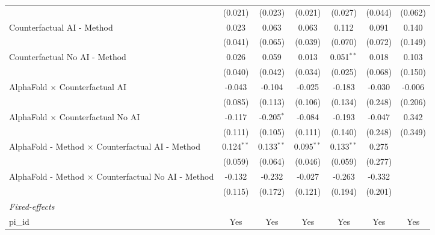 \begin{tabular}{lcccccc}
                                                              & (0.021)       & (0.023)       & (0.021)       & (0.027)       & (0.044)      & (0.062)\\   
   Counterfactual AI - Method                                 & 0.023         & 0.063         & 0.063         & 0.112         & 0.091        & 0.140\\   
                                                              & (0.041)       & (0.065)       & (0.039)       & (0.070)       & (0.072)      & (0.149)\\   
   Counterfactual No AI - Method                              & 0.026         & 0.059         & 0.013         & 0.051$^{**}$  & 0.018        & 0.103\\   
                                                              & (0.040)       & (0.042)       & (0.034)       & (0.025)       & (0.068)      & (0.150)\\   
   AlphaFold $\times$ Counterfactual AI                       & -0.043        & -0.104        & -0.025        & -0.183        & -0.030       & -0.006\\   
                                                              & (0.085)       & (0.113)       & (0.106)       & (0.134)       & (0.248)      & (0.206)\\   
   AlphaFold $\times$ Counterfactual No AI                    & -0.117        & -0.205$^{*}$  & -0.084        & -0.193        & -0.047       & 0.342\\   
                                                              & (0.111)       & (0.105)       & (0.111)       & (0.140)       & (0.248)      & (0.349)\\   
   AlphaFold - Method $\times$ Counterfactual AI - Method     & 0.124$^{**}$  & 0.133$^{**}$  & 0.095$^{**}$  & 0.133$^{**}$  & 0.275        &   \\   
                                                              & (0.059)       & (0.064)       & (0.046)       & (0.059)       & (0.277)      &   \\   
   AlphaFold - Method $\times$ Counterfactual No AI - Method  & -0.132        & -0.232        & -0.027        & -0.263        & -0.332       &   \\   
                                                              & (0.115)       & (0.172)       & (0.121)       & (0.194)       & (0.201)      &   \\   
   \midrule
   \emph{Fixed-effects}\\
   pi\_id                                                     & Yes           & Yes           & Yes           & Yes           & Yes          & Yes\\  

\end{tabular}
